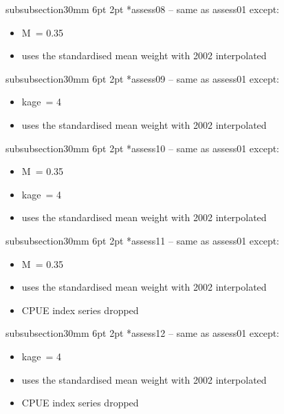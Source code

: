 \documentclass[11pt]{book}
\makeatletter
\renewcommand{\subsubsection}{\@startsection%
{subsubsection}{3}{0mm}%
{6pt \@plus -0pt \@minus -0pt}{2pt \@plus 0pt}%
{\normalfont\bf}}%
\makeatother
\begin{document}
\subsubsection*{assess08 -- same as assess01 except:}
\begin{itemize}[nosep]
  \item M~= 0.35
  \item uses the standardised mean weight with 2002 interpolated
\end{itemize}

\subsubsection*{assess09 -- same as assess01 except:}
\begin{itemize}[nosep]
  \item kage~= 4
  \item uses the standardised mean weight with 2002 interpolated
\end{itemize}

\subsubsection*{assess10 -- same as assess01 except:}
\begin{itemize}[nosep]
  \item M~= 0.35
  \item kage~= 4
  \item uses the standardised mean weight with 2002 interpolated
\end{itemize}

\subsubsection*{assess11 -- same as assess01 except:}
\begin{itemize}[nosep]
  \item M~= 0.35
  \item uses the standardised mean weight with 2002 interpolated
  \item CPUE index series dropped
\end{itemize}

\subsubsection*{assess12 -- same as assess01 except:}
\begin{itemize}[nosep]
  \item kage~= 4
  \item uses the standardised mean weight with 2002 interpolated
  \item CPUE index series dropped
\end{itemize}
\end{document}
